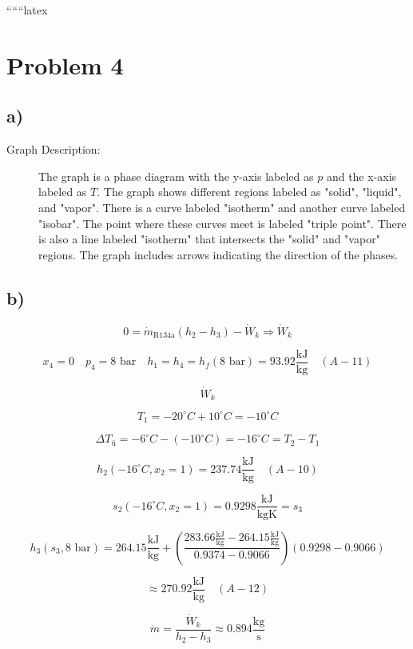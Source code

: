 
``````latex


\section*{Problem 4}

\subsection*{a)}

\begin{description}
    \item[Graph Description:] The graph is a phase diagram with the y-axis labeled as $p$ and the x-axis labeled as $T$. The graph shows different regions labeled as "solid", "liquid", and "vapor". There is a curve labeled "isotherm" and another curve labeled "isobar". The point where these curves meet is labeled "triple point". There is also a line labeled "isotherm" that intersects the "solid" and "vapor" regions. The graph includes arrows indicating the direction of the phases.
\end{description}

\subsection*{b)}

\[
0 = \dot{m}_{\text{R134a}} (h_2 - h_3) - \dot{W}_k \Rightarrow \dot{W}_k
\]

\[
x_4 = 0 \quad p_4 = 8 \text{ bar} \quad h_1 = h_4 = h_f(8 \text{ bar}) = 93.92 \frac{\text{kJ}}{\text{kg}} \quad (A-11)
\]

\[
\dot{W}_k
\]

\[
T_1 = -20^\circ C + 10^\circ C = -10^\circ C
\]

\[
\Delta T_{\text{ü}} = -6^\circ C - (-10^\circ C) = -16^\circ C = T_2 - T_1
\]

\[
h_2 (-16^\circ C, x_2 = 1) = 237.74 \frac{\text{kJ}}{\text{kg}} \quad (A-10)
\]

\[
s_2 (-16^\circ C, x_2 = 1) = 0.9298 \frac{\text{kJ}}{\text{kgK}} = s_3
\]

\[
h_3 (s_3, 8 \text{ bar}) = 264.15 \frac{\text{kJ}}{\text{kg}} + \left( \frac{283.66 \frac{\text{kJ}}{\text{kg}} - 264.15 \frac{\text{kJ}}{\text{kg}}}{0.9374 - 0.9066} \right) (0.9298 - 0.9066)
\]

\[
\approx 270.92 \frac{\text{kJ}}{\text{kg}} \quad (A-12)
\]

\[
\dot{m} = \frac{\dot{W}_k}{h_2 - h_3} \approx 0.894 \frac{\text{kg}}{\text{s}}
\]

